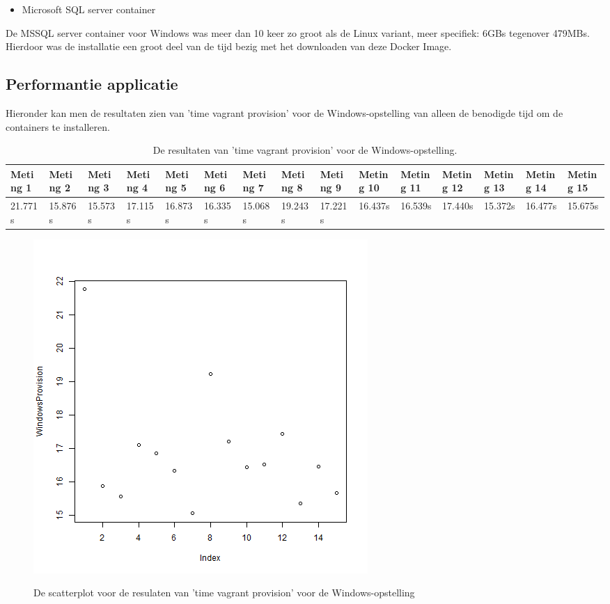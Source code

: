 \begin{itemize}[noitemsep]
	\item Microsoft SQL server container
\end{itemize}

De MSSQL server container voor Windows was meer dan 10 keer zo groot als de Linux variant, meer specifiek: 6GBs tegenover 479MBs. Hierdoor was de installatie een groot deel van de tijd bezig met het downloaden van deze Docker Image. \autocite{Moon2017}

\subsection{Performantie applicatie}
Hieronder kan men de resultaten zien van 'time vagrant provision' voor de Windows-opstelling van alleen de benodigde tijd om de containers te installeren.

\begin{table}
	\centering
	\begin{tabular}{lllllllllllllll}
		\hline
		Meting 1 & Meting 2 & Meting 3 & Meting 4 & Meting 5 & Meting 6 & Meting 7 & Meting 8 & Meting 9 & Meting 10 & Meting 11 & Meting 12 & Meting 13 & Meting 14 & Meting 15 \\
		\hline
		21.771s & 15.876s & 15.573s & 17.115s & 16.873s & 16.335s & 15.068s & 19.243s & 17.221s & 16.437s & 16.539s & 17.440s & 15.372s & 16.477s & 15.675s \\
		\hline
	\end{tabular}
	\caption{De resultaten van 'time vagrant provision' voor de Windows-opstelling.}
	\label{tab:timevagrantprovisionwindows}
\end{table}

\begin{figure}
	\centering
	\caption{De scatterplot voor de resulaten van 'time vagrant provision' voor de Windows-opstelling}
	\includegraphics[scale=0.5]{img/WindowsProvisionplot.png}
	\label{fig:windowsprovisionplot}
\end{figure}

